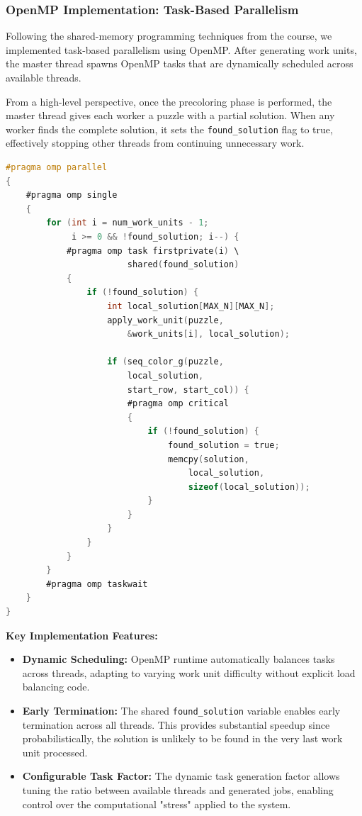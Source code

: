\begin{enumerate}
\subsubsection{OpenMP Implementation: Task-Based Parallelism}
\label{subsubsec:omp_implementation}
Following the shared-memory programming techniques from the course, we implemented task-based parallelism using OpenMP. After generating work units, the master thread spawns OpenMP tasks that are dynamically scheduled across available threads.

From a high-level perspective, once the precoloring phase is performed, the master thread gives each worker a puzzle with a partial solution. When any worker finds the complete solution, it sets the \texttt{found\_solution} flag to true, effectively stopping other threads from continuing unnecessary work.

\begin{lstlisting}[language=C, caption=OpenMP task-based implementation, label={listing:omp_implementation}]
#pragma omp parallel
{
    #pragma omp single
    {
        for (int i = num_work_units - 1; 
             i >= 0 && !found_solution; i--) {
            #pragma omp task firstprivate(i) \
                        shared(found_solution)
            {
                if (!found_solution) {
                    int local_solution[MAX_N][MAX_N];
                    apply_work_unit(puzzle, 
                        &work_units[i], local_solution);
                    
                    if (seq_color_g(puzzle, 
                        local_solution, 
                        start_row, start_col)) {
                        #pragma omp critical
                        {
                            if (!found_solution) {
                                found_solution = true;
                                memcpy(solution, 
                                    local_solution, 
                                    sizeof(local_solution));
                            }
                        }
                    }
                }
            }
        }
        #pragma omp taskwait
    }
}
\end{lstlisting}

\textbf{Key Implementation Features:}
\begin{itemize}
    \item \textbf{Dynamic Scheduling:} OpenMP runtime automatically balances tasks across threads, adapting to varying work unit difficulty without explicit load balancing code.
    \item \textbf{Early Termination:} The shared \texttt{found\_solution} variable enables early termination across all threads. This provides substantial speedup since probabilistically, the solution is unlikely to be found in the very last work unit processed.
    \item \textbf{Configurable Task Factor:} The dynamic task generation factor allows tuning the ratio between available threads and generated jobs, enabling control over the computational "stress" applied to the system.
\end{itemize}


\end{enumerate}
